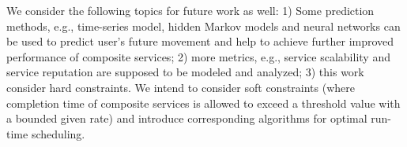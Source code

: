 \documentclass[journal]{IEEEtran}
\begin{document}
We consider the following topics for future work as well: 1) Some prediction methods, e.g., time-series model, hidden Markov models and neural networks can be used to predict user's future movement and help to achieve further improved performance of composite services; 2) more metrics, e.g., service scalability and service reputation are supposed to be modeled and  analyzed; 3) this work consider hard constraints. We intend to consider soft constraints (where completion time of composite services is allowed to exceed a threshold value with a bounded given rate) and introduce corresponding algorithms for optimal run-time scheduling.



\ifCLASSOPTIONcaptionsoff
  \newpage
\fi






\end{document}
